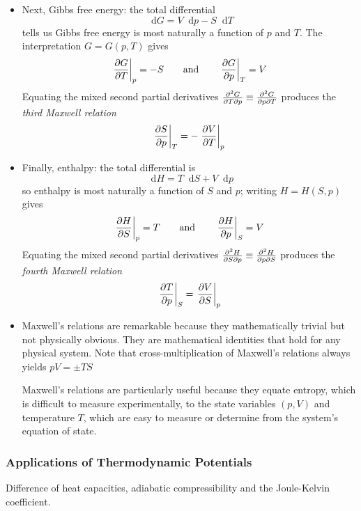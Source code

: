 \documentclass[11pt, a4paper]{article}
\newcommand{\diff}{\mathop{}\!\mathrm{d}} %
\begin{document}
\begin{itemize}
	\item Next, Gibbs free energy: the total differential 
	\begin{equation*}
		\diff G = V\diff p - S \diff T
	\end{equation*}
	tells us Gibbs free energy is most naturally a function of $ p $ and $ T $. The interpretation $ G = G(p, T) $ gives
	\begin{equation*}
		\eval{\pdv{G}{T}}_{p} = - S \qquad \text{and} \qquad \eval{\pdv{G}{p}}_{T} = V
	\end{equation*}
	Equating the mixed second partial derivatives $ \pdv{G}{T}{p} \equiv \pdv{G}{p}{T} $ produces the \textit{third Maxwell relation}
	\begin{equation*}
		\eval{\pdv{S}{p}}_{T} = -\eval{\pdv{V}{T}}_{p}
	\end{equation*}
	
	\item Finally, enthalpy: the total differential is
	\begin{equation*}
		\diff H = T \diff S + V \diff p 
	\end{equation*}
	so enthalpy is most naturally a function of $ S $ and $ p $; writing $ H = H(S, p) $ gives
	\begin{equation*}
		\eval{\pdv{H}{S}}_{p} = T \qquad \text{and} \qquad \eval{\pdv{H}{p}}_{S} = V
	\end{equation*}
	Equating the mixed second partial derivatives $ \pdv{H}{S}{p} \equiv \pdv{H}{p}{S} $ produces the \textit{fourth Maxwell relation}
	\begin{align*}
		\eval{\pdv{T}{p}}_{S} = \eval{\pdv{V}{S}}_{p} 
	\end{align*}
	
	\item Maxwell's relations are remarkable because they mathematically trivial but not physically obvious. They are mathematical identities that hold for any physical system. 	Note that cross-multiplication of Maxwell's relations always yields $ pV = \pm TS $
	
	Maxwell's relations are particularly useful because they equate entropy, which is difficult to measure experimentally, to the  state variables $ (p, V) $ and temperature $ T $, which are easy to measure or determine from the system's equation of state.
	
\end{itemize}

\subsubsection{Applications of Thermodynamic Potentials}
Difference of heat capacities, adiabatic compressibility and the Joule-Kelvin coefficient.
\end{document}
